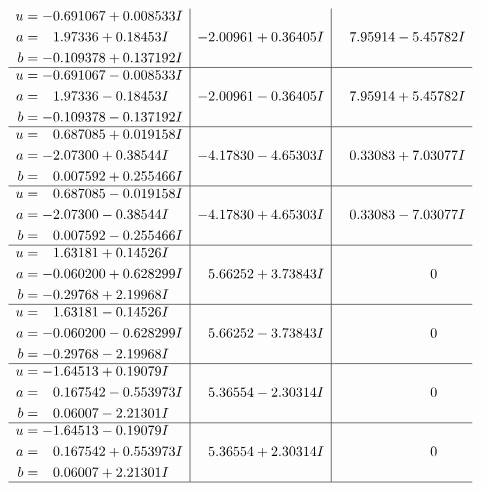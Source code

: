 \documentclass[1p]{elsarticle_modified}
\theoremstyle{definition}
\begin{document}
$$\begin{array}{c|c|c}
\begin{aligned}
u &= -0.691067 + 0.008533 I \\
a &= \phantom{-}1.97336 + 0.18453 I \\
b &= -0.109378 + 0.137192 I\end{aligned}
 & -2.00961 + 0.36405 I & \phantom{-}7.95914 - 5.45782 I \\ \hline\begin{aligned}
u &= -0.691067 - 0.008533 I \\
a &= \phantom{-}1.97336 - 0.18453 I \\
b &= -0.109378 - 0.137192 I\end{aligned}
 & -2.00961 - 0.36405 I & \phantom{-}7.95914 + 5.45782 I \\ \hline\begin{aligned}
u &= \phantom{-}0.687085 + 0.019158 I \\
a &= -2.07300 + 0.38544 I \\
b &= \phantom{-}0.007592 + 0.255466 I\end{aligned}
 & -4.17830 - 4.65303 I & \phantom{-}0.33083 + 7.03077 I \\ \hline\begin{aligned}
u &= \phantom{-}0.687085 - 0.019158 I \\
a &= -2.07300 - 0.38544 I \\
b &= \phantom{-}0.007592 - 0.255466 I\end{aligned}
 & -4.17830 + 4.65303 I & \phantom{-}0.33083 - 7.03077 I \\ \hline\begin{aligned}
u &= \phantom{-}1.63181 + 0.14526 I \\
a &= -0.060200 + 0.628299 I \\
b &= -0.29768 + 2.19968 I\end{aligned}
 & \phantom{-}5.66252 + 3.73843 I & \phantom{-0.000000 } 0 \\ \hline\begin{aligned}
u &= \phantom{-}1.63181 - 0.14526 I \\
a &= -0.060200 - 0.628299 I \\
b &= -0.29768 - 2.19968 I\end{aligned}
 & \phantom{-}5.66252 - 3.73843 I & \phantom{-0.000000 } 0 \\ \hline\begin{aligned}
u &= -1.64513 + 0.19079 I \\
a &= \phantom{-}0.167542 - 0.553973 I \\
b &= \phantom{-}0.06007 - 2.21301 I\end{aligned}
 & \phantom{-}5.36554 - 2.30314 I & \phantom{-0.000000 } 0 \\ \hline\begin{aligned}
u &= -1.64513 - 0.19079 I \\
a &= \phantom{-}0.167542 + 0.553973 I \\
b &= \phantom{-}0.06007 + 2.21301 I\end{aligned}
 & \phantom{-}5.36554 + 2.30314 I & \phantom{-0.000000 } 0\\
 \hline 
 \end{array}$$\newpage\newpage\renewcommand{\arraystretch}{1}
\end{document}

